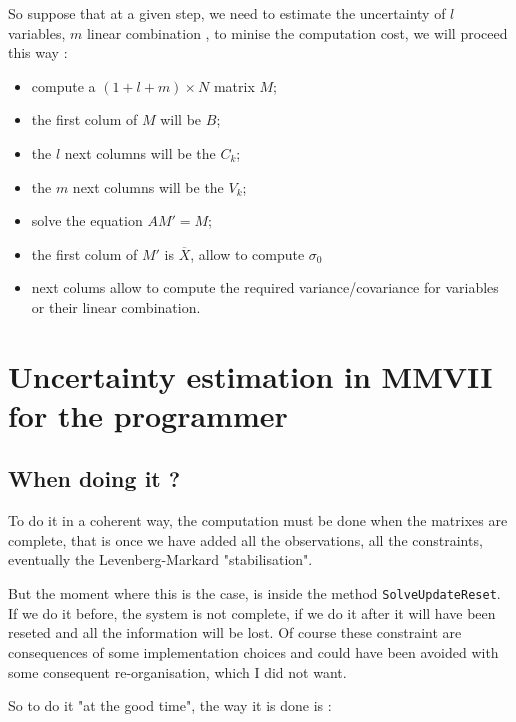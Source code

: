 So suppose that at a given step, we need to estimate the uncertainty of $l$ variables, $m$ linear combination , to minise
the computation cost, we will proceed this way :

\begin{itemize}
     \item  compute a $(1+l+m) \times N$ matrix $M$;
     \item  the first colum of $M$ will be $B$;
     \item  the $l$ next columns will be the $C_k$;
     \item  the $m$ next columns will be the $V_k$;
     \item  solve the  equation $A M' = M$;
     \item the first colum of $M'$ is $\overline X$, allow to compute $\sigma_0$
     \item next colums allow to compute the required variance/covariance for variables or their linear combination.
\end{itemize}



\section{Uncertainty estimation in MMVII for the programmer}

\subsection{When doing it ?} 

To do it  in a coherent way, the computation must be done when the matrixes are  complete, 
that is once we have added all the observations, all the constraints, eventually the
Levenberg-Markard "stabilisation".

But the moment where this is the case, is inside the method {\tt SolveUpdateReset}. If we do it before,
the system is not complete, if we do it after it will have been reseted and all the information will
be lost.  Of course these constraint are consequences of some implementation choices and could
have been avoided with some consequent re-organisation, which I did not want.

So to do it "at the good time", the way it is done is :


